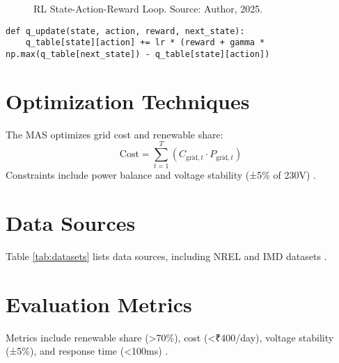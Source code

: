 \documentclass[12pt]{report}
\begin{document}
\begin{figure}[h]
  \centering
  \caption{RL State-Action-Reward Loop. Source: Author, 2025.}
  \label{fig:rl_loop}
\end{figure}

\begin{lstlisting}[caption={Q-Learning Update Rule},label={lst:q_learning}]
def q_update(state, action, reward, next_state):
    q_table[state][action] += lr * (reward + gamma * np.max(q_table[next_state]) - q_table[state][action])
\end{lstlisting}

\section{Optimization Techniques}
The MAS optimizes grid cost and renewable share:
\begin{equation}
\text{Cost} = \sum_{t=1}^T (C_{\text{grid},t} \cdot P_{\text{grid},t})
\label{eq:cost}
\end{equation}
Constraints include power balance and voltage stability (±5\% of 230V) \cite{mnre2023}.

\section{Data Sources}
Table \ref{tab:datasets} lists data sources, including NREL and IMD datasets \cite{nrel2024, imd2025}.

\begin{table}[h]
  \centering
  \caption{Dataset Descriptions}
  \label{tab:datasets}
\end{table}

\section{Evaluation Metrics}
Metrics include renewable share (>70\%), cost (<₹400/day), voltage stability (±5\%), and response time (<100ms) \cite{author2025}.
\end{document}
